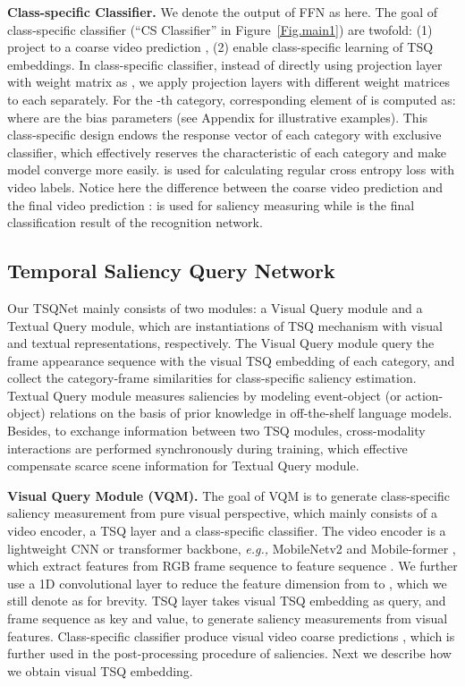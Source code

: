 \documentclass[runningheads]{llncs}
\newcommand{\figref}[1]{Figure~\ref{#1}}
\begin{document}
\noindent\textbf{Class-specific Classifier.}
We denote the output of FFN as  here. The goal of class-specific classifier (``CS Classifier'' in \figref{Fig.main1}) are twofold: (1) project  to a coarse video prediction , (2) enable class-specific learning of TSQ embeddings. In class-specific classifier, instead of directly using projection layer with weight matrix  as , we apply  projection layers with different weight matrices  to each  separately. For the -th category, corresponding element of  is computed as: 
\label{spfc}
where  are the bias parameters (see Appendix for illustrative examples).
This class-specific design endows the response vector of each category with exclusive classifier, which effectively reserves the characteristic of each category and make model converge more easily.  is used for calculating regular cross entropy loss with video labels. Notice here the difference between the coarse video prediction  and the final video prediction :  is used for saliency measuring while  is the final classification result of the recognition network.




\subsection{Temporal Saliency Query Network}\label{TSQNet}
Our TSQNet mainly consists of two modules: a Visual Query module and a Textual Query module, which are instantiations of TSQ mechanism with visual and textual representations, respectively. The Visual Query module query the frame appearance sequence with the visual TSQ embedding of each category, and collect the category-frame similarities for class-specific saliency estimation. Textual Query module measures saliencies by modeling event-object (or action-object) relations on the basis of prior knowledge in off-the-shelf language models. Besides, to exchange information between two TSQ modules, cross-modality interactions are performed synchronously during training, which effective compensate scarce scene information for Textual Query module. 


\noindent\textbf{Visual Query Module (VQM).}
The goal of VQM is to generate class-specific saliency measurement from pure visual perspective, which mainly consists of a video encoder, a TSQ layer and a class-specific classifier. The video encoder is a lightweight CNN or transformer backbone, \emph{e.g.,} MobileNetv2 \cite{mobilenetv2} and Mobile-former \cite{mobileformer}, which extract features from RGB frame sequence  to feature sequence . We further use a 1D convolutional layer to reduce the feature dimension from  to , which we still denote as  for brevity. TSQ layer takes visual TSQ embedding as query, and frame sequence as key and value, to generate saliency measurements  from visual features. Class-specific classifier produce visual video coarse predictions , which is further used in the post-processing procedure of saliencies. Next we describe how we obtain visual TSQ embedding.
\end{document}
